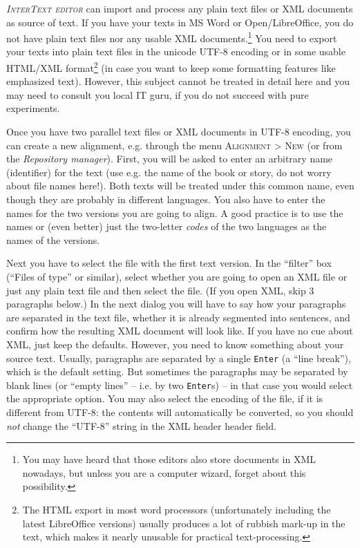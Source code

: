 \documentclass[a4paper,10pt,oneside]{book}
\newcommand{\ITeditor}{\textit{\textsc{InterText editor}}\xspace}
\newcommand{\keys}[1]{\texttt{#1}}
\newcommand{\menu}[1]{\textsc{#1}}
\begin{document}
\ITeditor can import and process any plain text files or XML documents as source of text. If you have your texts in MS Word or Open/LibreOffice, you do not have plain text files nor any usable XML documents.\footnote{You may have heard that those editors also store documents in XML nowadays, but unless you are a computer wizard, forget about this possibility.} You need to export your texts into plain text files in the unicode UTF-8 encoding or in some usable HTML/XML format\footnote{The HTML export in most word processors (unfortunately including the latest LibreOffice versions) usually produces a lot of rubbish mark-up in the text, which makes it nearly unusable for practical text-processing.} (in case you want to keep some formatting features like emphasized text). However, this subject cannot be treated in detail here and you may need to consult you local IT guru, if you do not succeed with pure experiments.

Once you have two parallel text files or XML documents in UTF-8 encoding, you can create a new alignment, e.g. through the menu \menu{Alignment} > \menu{New} (or from the \emph{Repository manager}). First, you will be asked to enter an arbitrary name (identifier) for the text (use e.g. the name of the book or story, do not worry about file names here!). Both texts will be treated under this common name, even though they are probably in different languages. You also have to enter the names for the two versions you are going to align. A good practice is to use the names or (even better) just the two-letter \emph{codes} of the two languages as the names of the versions.

Next you have to select the file with the first text version. In the ``filter'' box (``Files of type'' or similar), select whether you are going to open an XML file or just any plain text file and then select the file. (If you open XML, skip 3 paragraphs below.) In the next dialog you will have to say how your paragraphs are separated in the text file, whether it is already segmented into sentences, and confirm how the resulting XML document will look like. If you have no cue about XML, just keep the defaults. However, you need to know something about your source text. Usually, paragraphs are separated by a single \keys{Enter} (a ``line break''), which is the default setting. But sometimes the paragraphs may be separated by blank lines (or ``empty lines'' -- i.e. by two \keys{Enter}s) -- in that case you would select the appropriate option. You may also select the encoding of the file, if it is different from UTF-8: the contents will automatically be converted, so you should \emph{not} change the ``UTF-8'' string in the XML header header field.
\end{document}
